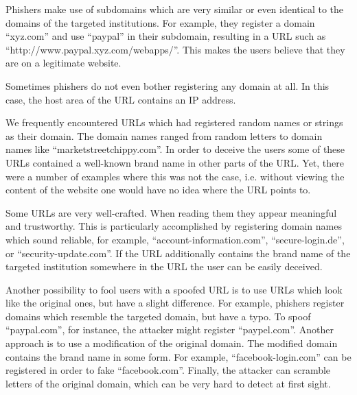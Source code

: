 \begin{description}[leftmargin=0cm]
	\item[Subdomains:] Phishers make use of subdomains which are very similar or even identical to the domains of the targeted institutions.
 For example, they register a domain  ``xyz.com'' and use ``paypal'' in their subdomain, resulting in a URL such as ``http://www.paypal.xyz.com/webapps/''.
 This makes the users believe that they are on a legitimate website.

	\item[IP Addresses:] Sometimes phishers do not even bother registering any domain at all.
 In this case, the host area of the URL contains an IP address.

	\item[Nonsense Domains:] We frequently encountered URLs which had registered random names or strings as their domain.
 The domain names ranged from random letters to domain names like ``marketstreetchippy.com''. In order to deceive the users some of these URLs contained a well-known brand name in other parts of the URL.
Yet, there were a number of examples where this was not the case, i.e. without viewing the content of the website one would have no idea where the URL points to.

	\item[Trustworthy, but Unrelated Domains:] Some URLs are very well-crafted.
 When reading them they appear meaningful and trustworthy.
 This is particularly accomplished by registering domain names which sound reliable, for example, ``account-information.com'', ``secure-login.de'', or ``security-update.com''. If the URL additionally contains the brand name of the targeted institution somewhere in the URL the user can be easily deceived.

	\item[Similar and Deceptive Domains:] Another possibility to fool users with a spoofed URL is to use URLs which look like the original ones, but have a slight difference.
 For example, phishers register domains which resemble the targeted domain, but have a typo.
 To spoof ``paypal.com'', for instance, the attacker might register ``paypel.com''. Another approach is to use a modification of the original domain.
 The modified domain contains the brand name in some form.
 For example, ``facebook-login.com'' can be registered in order to fake ``facebook.com''. Finally, the attacker can scramble letters of the original domain, which can be very hard to detect at first sight.


\end{description}
